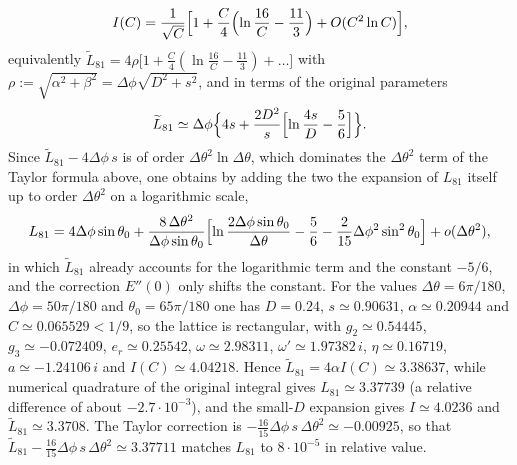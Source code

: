 $$I(C)=\frac1{\sqrt C}\Bigl[1+\frac C4\Bigl(\ln\frac{16}{C}-\frac{11}{3}\Bigr)+O(C^2\ln C)\Bigr],$$
equivalently $\widetilde L_{81}=4\rho\bigl[1+\tfrac C4(\ln\tfrac{16}{C}-\tfrac{11}3)+\dots\bigr]$ with $\rho:=\sqrt{\alpha^2+\beta^2}=\Delta\phi\sqrt{D^2+s^2}$, and in terms of the original parameters
$$\widetilde L_{81}\simeq\Delta\phi\Bigl\{4s+\frac{2D^2}{s}\Bigl[\ln\frac{4s}{D}-\frac56\Bigr]\Bigr\}.$$
Since $\widetilde L_{81}-4\Delta\phi\,s$ is of order $\Delta\theta^2\ln\Delta\theta$, which dominates the $\Delta\theta^2$ term of the Taylor formula above, one obtains by adding the two the expansion of $L_{81}$ itself up to order $\Delta\theta^2$ on a logarithmic scale,
$$L_{81}=4\Delta\phi\sin\theta_0+\frac{8\,\Delta\theta^2}{\Delta\phi\sin\theta_0}\Bigl[\ln\frac{2\Delta\phi\sin\theta_0}{\Delta\theta}-\frac56-\frac2{15}\Delta\phi^2\sin^2\theta_0\Bigr]+o(\Delta\theta^2),$$
in which $\widetilde L_{81}$ already accounts for the logarithmic term and the constant $-5/6$, and the correction $E''(0)$ only shifts the constant.
For the values $\Delta\theta=6\pi/180$, $\Delta\phi=50\pi/180$ and $\theta_0=65\pi/180$ one has $D=0.24$, $s\simeq0.90631$, $\alpha\simeq0.20944$ and $C\simeq0.065529<1/9$, so the lattice is rectangular, with $g_2\simeq0.54445$, $g_3\simeq-0.072409$, $e_r\simeq0.25542$, $\omega\simeq2.98311$, $\omega'\simeq1.97382\,i$, $\eta\simeq0.16719$, $a\simeq-1.24106\,i$ and $I(C)\simeq4.04218$. Hence $\widetilde L_{81}=4\alpha I(C)\simeq3.38637$, while numerical quadrature of the original integral gives $L_{81}\simeq3.37739$ (a relative difference of about $-2.7\cdot10^{-3}$), and the small-$D$ expansion gives $I\simeq4.0236$ and $\widetilde L_{81}\simeq3.3708$. 
The Taylor correction is $-\tfrac{16}{15}\Delta\phi\,s\,\Delta\theta^2\simeq-0.00925$, so that $\widetilde L_{81}-\tfrac{16}{15}\Delta\phi\,s\,\Delta\theta^2\simeq3.37711$ matches $L_{81}$ to $8\cdot10^{-5}$ in relative value.
